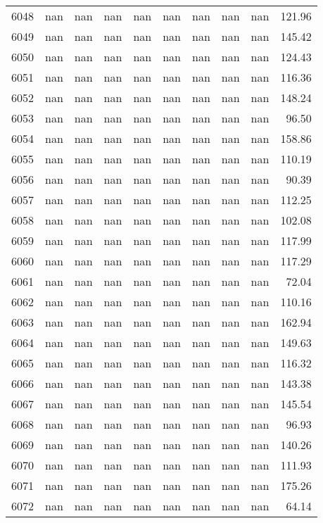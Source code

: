 \begin{tabular}{lrrrrrrrrr}
6048 & nan & nan & nan & nan & nan & nan & nan & nan & 121.96 \\
6049 & nan & nan & nan & nan & nan & nan & nan & nan & 145.42 \\
6050 & nan & nan & nan & nan & nan & nan & nan & nan & 124.43 \\
6051 & nan & nan & nan & nan & nan & nan & nan & nan & 116.36 \\
6052 & nan & nan & nan & nan & nan & nan & nan & nan & 148.24 \\
6053 & nan & nan & nan & nan & nan & nan & nan & nan & 96.50 \\
6054 & nan & nan & nan & nan & nan & nan & nan & nan & 158.86 \\
6055 & nan & nan & nan & nan & nan & nan & nan & nan & 110.19 \\
6056 & nan & nan & nan & nan & nan & nan & nan & nan & 90.39 \\
6057 & nan & nan & nan & nan & nan & nan & nan & nan & 112.25 \\
6058 & nan & nan & nan & nan & nan & nan & nan & nan & 102.08 \\
6059 & nan & nan & nan & nan & nan & nan & nan & nan & 117.99 \\
6060 & nan & nan & nan & nan & nan & nan & nan & nan & 117.29 \\
6061 & nan & nan & nan & nan & nan & nan & nan & nan & 72.04 \\
6062 & nan & nan & nan & nan & nan & nan & nan & nan & 110.16 \\
6063 & nan & nan & nan & nan & nan & nan & nan & nan & 162.94 \\
6064 & nan & nan & nan & nan & nan & nan & nan & nan & 149.63 \\
6065 & nan & nan & nan & nan & nan & nan & nan & nan & 116.32 \\
6066 & nan & nan & nan & nan & nan & nan & nan & nan & 143.38 \\
6067 & nan & nan & nan & nan & nan & nan & nan & nan & 145.54 \\
6068 & nan & nan & nan & nan & nan & nan & nan & nan & 96.93 \\
6069 & nan & nan & nan & nan & nan & nan & nan & nan & 140.26 \\
6070 & nan & nan & nan & nan & nan & nan & nan & nan & 111.93 \\
6071 & nan & nan & nan & nan & nan & nan & nan & nan & 175.26 \\
6072 & nan & nan & nan & nan & nan & nan & nan & nan & 64.14 \\

\end{tabular}
